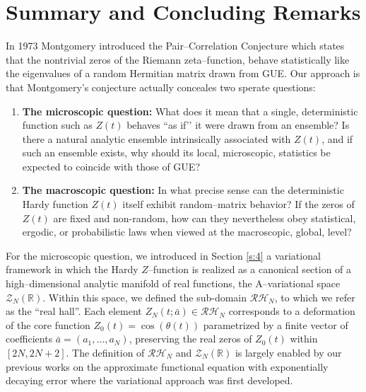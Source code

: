 \documentclass[12pt,reqno]{amsart}
\theoremstyle{plain}
\theoremstyle{definition}
\theoremstyle{remark}
\begin{document}
\section{Summary and Concluding Remarks}
\label{s:10}


In 1973 Montgomery introduced the Pair--Correlation Conjecture \cite{M} which states that the nontrivial zeros of the Riemann zeta--function, behave statistically like the eigenvalues of a random Hermitian matrix 
drawn from GUE.  Our approach is that Montgomery's conjecture actually conceales two sperate questions:

\begin{enumerate}
\item \textbf{The microscopic question:}  
What does it mean that a single, deterministic function such as $Z(t)$ 
behaves “as if’’ it were drawn from an ensemble?  
Is there a natural analytic ensemble intrinsically associated with $Z(t)$, 
and if such an ensemble exists, why should its local, microscopic, statistics 
be expected to coincide with those of GUE?

\item \textbf{The macroscopic question:}  
In what precise sense can the deterministic Hardy function $Z(t)$ itself 
exhibit random–matrix behavior?  
If the zeros of $Z(t)$ are fixed and non-random, 
how can they nevertheless obey statistical, ergodic, or probabilistic laws 
when viewed at the macroscopic, global, level?

\end{enumerate}

For the microscopic question, we introduced in Section \ref{s:4} a variational framework in which the Hardy $Z$--function is realized as a canonical section
of a high--dimensional analytic manifold of real functions, the 
A--variational space $\mathcal{Z}_N(\mathbb{R})$.
Within this space, we defined the sub-domain $\mathcal{RH}_N$, to which we refer as the ``real hall''. Each element $Z_N(t;\bar a)\in\mathcal{RH}_N$ corresponds to a deformation of the core function 
$Z_0(t)=\cos(\theta(t))$ parametrized by a finite vector of coefficients $\bar a=(a_1,\dots,a_N)$, preserving the real zeros of $Z_0(t)$ within $[2N,2N+2]$. 
The definition of $\mathcal{RH}_N$ and $\mathcal{Z}_N(\mathbb{R})$ is largely enabled by our previous works on the approximate functional equation with exponentially decaying error \cite{J5,J3,J4} where the variational approach was first developed. 
\end{document}
